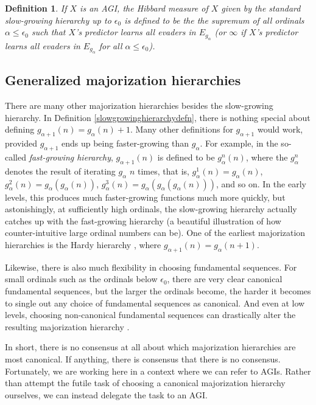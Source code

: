 \documentclass{article}
\newtheorem{definition}[theorem]{Definition}
\begin{document}
\begin{definition}
\label{tradmajorizationhierarchyhibbardmeasuredefn}
    If $X$ is an AGI, the \emph{Hibbard measure of $X$ given by the standard
    slow-growing hierarchy up to $\epsilon_0$} is defined to be the
    the supremum of all ordinals $\alpha\leq\epsilon_0$ such that
    $X$'s predictor learns all evaders in $E_{g_\alpha}$ (or $\infty$ if
    $X$'s predictor learns all evaders in $E_{g_\alpha}$ for all $\alpha\leq\epsilon_0$).
\end{definition}

\subsection{Generalized majorization hierarchies}

There are many other majorization hierarchies besides the slow-growing hierarchy.
In Definition \ref{slowgrowinghierarchydefn},
there is nothing special about defining $g_{\alpha+1}(n)=g_{\alpha}(n)+1$.
Many other definitions for $g_{\alpha+1}$ would work, provided $g_{\alpha+1}$ ends
up being faster-growing than $g_\alpha$.
For example, in the so-called \emph{fast-growing hierarchy},
$g_{\alpha+1}(n)$ is defined to be $g^n_\alpha(n)$, where the $g^n_\alpha$
denotes the result of iterating $g_\alpha$ $n$ times, that is,
$g^1_\alpha(n)=g_\alpha(n)$, $g^2_\alpha(n)=g_\alpha(g_\alpha(n))$,
$g^3_\alpha(n)=g_\alpha(g_\alpha(g_\alpha(n)))$, and so on.
In the early levels, this produces much faster-growing functions much more quickly,
but astonishingly, at sufficiently high ordinals, the slow-growing hierarchy
actually catches up with the fast-growing hierarchy \cite{girard1981pi12}
(a beautiful illustration of how counter-intuitive large ordinal numbers can be).
One of the earliest majorization hierarchies is the Hardy
hierarchy \cite{hardy1904theorem}, where $g_{\alpha+1}(n)=g_\alpha(n+1)$.

Likewise, there is also much flexibility in choosing fundamental sequences.
For small ordinals such as the ordinals below $\epsilon_0$, there are very clear
canonical fundamental sequences, but the larger the ordinals become, the harder
it becomes to single out any choice of fundamental sequences as canonical.
And even at low levels, choosing non-canonical fundamental sequences can
drastically alter the resulting majorization hierarchy \cite{weiermann1997sometimes}.

In short, there is no consensus at all about which majorization hierarchies are
most canonical. If anything, there is consensus that there is no consensus.
Fortunately, we are working here in a context where we can refer to AGIs.
Rather than attempt the futile task of choosing a canonical majorization hierarchy
ourselves, we can instead delegate the task to an AGI.
\end{document}

